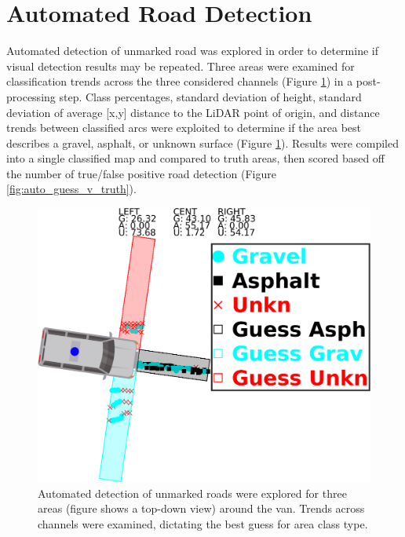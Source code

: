 \documentclass[numbered,pdftex]{ohio-etd}
\begin{document}
{{	}
	
	\section{Automated Road Detection}\label{sec:auto_road_detection}{
		
		{Automated detection of unmarked road was explored in order to determine if visual detection results may be repeated. Three areas were examined for classification trends across the three considered channels (Figure \ref{fig:auto_guess_areas}) in a post-processing step. Class percentages, standard deviation of height, standard deviation of average [x,y] distance to the LiDAR point of origin, and distance trends between classified arcs were exploited to determine if the area best describes a gravel, asphalt, or unknown surface (Figure \ref{fig:auto_guess_areas}). Results were compiled into a single classified map and compared to truth areas, then scored based off the number of true/false positive road detection (Figure \ref{fig:auto_guess_v_truth}).}	
		
		\begin{figure}[H]
			\centering
			\includegraphics[width=0.9\linewidth]{Defense_Images/auto_area_guess}
			\caption[Projected Automated Guess vs Truth]{Automated detection of unmarked roads were explored for three areas (figure shows a top-down view) around the van. Trends across channels were examined, dictating the best guess for area class type. }
			\label{fig:auto_guess_areas}
		\end{figure}
		
}}
\end{document}
